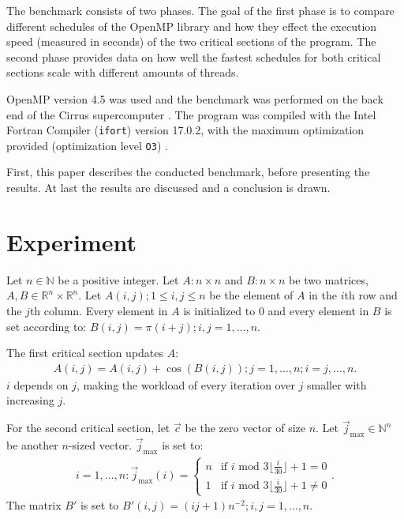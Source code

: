 \documentclass[twoside,11pt]{article}
\begin{document}
The benchmark consists of two phases.
The goal of the first phase is to compare different
schedules of the OpenMP library and how they
effect the execution speed (measured in seconds) of the two
critical sections of the program.
The second phase provides data on how well the fastest
schedules for both critical sections scale with
different amounts of threads.

OpenMP version 4.5 was used and the benchmark was performed
on the back end of the Cirrus supercomputer
\citep[see][]{openmp, cirrus}.
The program was compiled with the Intel Fortran Compiler
(\texttt{ifort}) version 17.0.2, with the maximum
optimization provided (optimization level \texttt{O3})
\citep[see][]{ifort}.

First, this paper describes the conducted benchmark,
before presenting the results. At last the results are
discussed and a conclusion is drawn.


\section{Experiment} %
\label{sec:exp}

Let $n \in \mathbb{N}$ be a positive integer.
Let $A: n \times n$ and $B: n \times n$ be two matrices,
$A, B \in \mathbb{R}^n \times \mathbb{R}^n$.
Let $A(i, j); 1 \leq i, j \leq n$ be the element of $A$ in
the $i$th row and the $j$th column.
Every element in $A$ is initialized to 0 and every element
in $B$ is set according to:
$B(i, j) = \pi(i+j); i,j=1,\dots,n$.

The first critical section updates $A$:
\begin{align}
  \label{eq:cs1}
  A(i, j) = A(i, j) + \cos(B(i, j)); j=1,\dots,n; i=j,\dots,n.
\end{align}
$i$ depends on $j$, making the workload of every iteration
over $j$ smaller with increasing $j$.

\def\jmax{\vec{j}_{\text{max} }}

For the second critical section,
let $\vec{c}$ be the zero vector of size $n$.
Let $\jmax \in \mathbb{N}^n$ be another $n$-sized vector.
$\jmax$ is set to:
\begin{align}
  \label{eq:jmax}
  i=1,\dots,n: \jmax(i) =
  \begin{cases}
    n &\text{if } i \text{ mod }
       3\lfloor \frac{i}{30} \rfloor + 1 = 0 \\
    1 &\text{if } i \text{ mod }
       3\lfloor \frac{i}{30} \rfloor + 1 \neq 0
  \end{cases}.
\end{align}
The matrix $B'$ is set to $B'(i, j) = (ij + 1)n^{-2};
i,j = 1,\dots,n$.
\end{document}
